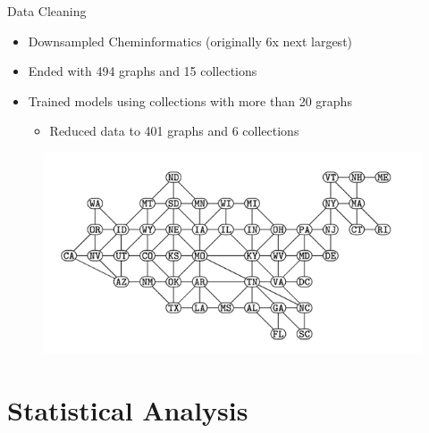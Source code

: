 \documentclass{beamer}
\begin{document}
\begin{frame}{Data Cleaning}
    \begin{itemize}
        \item Downsampled Cheminformatics (originally 6x next largest)
        \item Ended with 494 graphs and 15 collections
        \item Trained models using collections with more than 20 graphs
        \begin{itemize}
        \vspace{-\baselineskip}
            \item Reduced data to 401 graphs and 6 collections
        
        \end{itemize}

    \end{itemize}
    \begin{figure}
        \centering
        \includegraphics[scale = 0.27]{contiguous-usa-graph}
      
    \end{figure}    
    
\end{frame}


\section{Statistical Analysis} 
\end{document}
